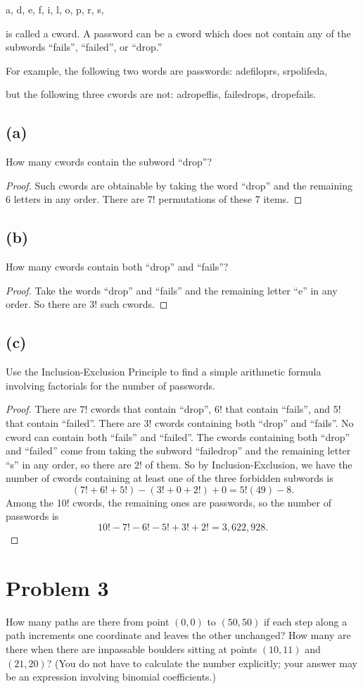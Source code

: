 \documentclass[14pt]{extarticle}
\begin{document}
a, d, e, f, i, l, o, p, r, s,

is called a cword. A password can be a cword which does not contain any of the subwords “fails”, “failed”, or “drop.”

For example, the following two words are passwords: adefiloprs, srpolifeda,

but the following three cwords are not: adropeflis, failedrops, dropefails.

\subsection{(a)}
How many cwords contain the subword “drop”?
\begin{proof}
Such cwords are obtainable by taking the word “drop” and the remaining 6 letters in any order. There are 7! permutations of these 7 items.
\end{proof}

\subsection{(b)}
How many cwords contain both “drop” and “fails”?
\begin{proof}
Take the words “drop” and “fails” and the remaining letter “e” in any order. So there are 3! such cwords.
\end{proof}

\subsection{(c)}
Use the Inclusion-Exclusion Principle to find a simple arithmetic formula involving factorials for the number of passwords.
\begin{proof}
There are 7! cwords that contain “drop”, 6! that contain “fails”, and 5! that contain “failed”. There are 3! cwords containing both “drop” and “fails”. No cword can contain both “fails” and “failed”. The cwords containing both “drop” and “failed” come from taking the subword “failedrop” and the remaining letter “s” in any order, so there are 2! of them. So by Inclusion-Exclusion, we have the number of cwords containing at least one of the three forbidden subwords is
$$
(7! + 6! + 5!) - (3! + 0 + 2!) + 0 = 5!(49) - 8.
$$
Among the 10! cwords, the remaining ones are passwords, so the number of passwords is
$$
10! - 7! - 6! - 5! + 3! + 2! = 3,622,928.
$$
\end{proof}

\section{Problem 3}
How many paths are there from point $(0,0)$ to $(50,50)$ if each step along a path increments one coordinate and leaves the other unchanged? How many are there when there are impassable boulders sitting at points $(10,11)$ and $(21,20)$? (You do not have to calculate the number explicitly; your answer may be an expression
involving binomial coefficients.)
\end{document}
